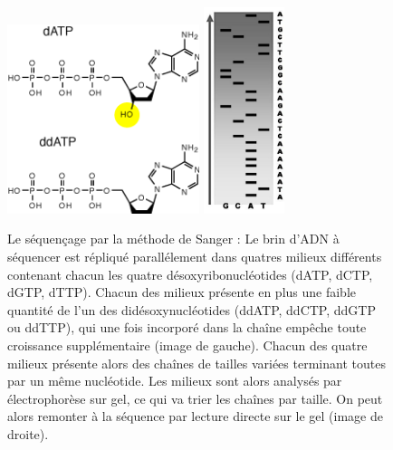 \documentclass[a4paper,11pt]{article}
\begin{document}
\begin{figure}[H]
\begin{center}
\includegraphics[width=0.5\textwidth]{ddatp.png}\hspace{1.3cm} \includegraphics[width=0.21\textwidth]{gelelectrophoresis.jpg}
\vspace{0.5cm}

\caption{Le séquençage par la méthode de Sanger : Le brin d'ADN à séquencer est répliqué parallélement dans quatres milieux différents contenant chacun les quatre désoxyribonucléotides (dATP, dCTP, dGTP, dTTP). Chacun des milieux présente en plus une faible quantité de l'un des didésoxynucléotides (ddATP, ddCTP, ddGTP ou ddTTP), qui une fois incorporé dans la cha\^{i}ne empêche toute croissance supplémentaire (image de gauche). Chacun des quatre milieux présente alors des cha\^{i}nes de tailles variées terminant toutes par un même nucléotide. Les milieux sont alors analysés par électrophorèse sur gel, ce qui va trier les cha\^{i}nes par taille. On peut alors remonter à la séquence par lecture directe sur le gel (image de droite).}
\label{sangermethod}
\end{center}
\end{figure}
\end{document}
